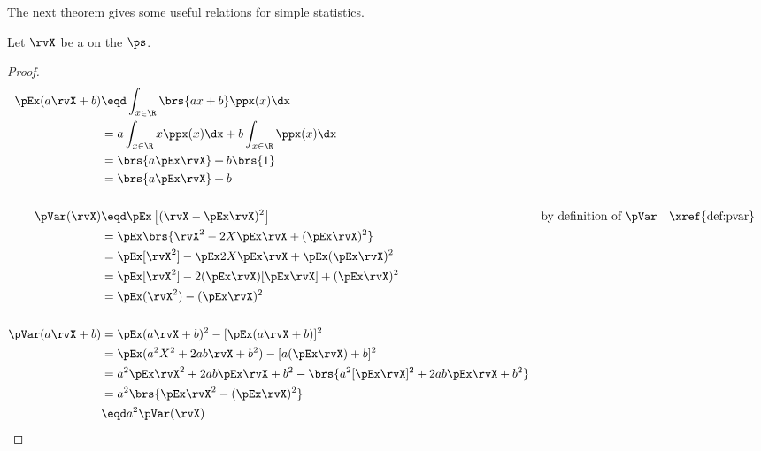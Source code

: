 The next theorem gives some useful relations for simple statistics.
\begin{theorem}
\label{thm:pE}
Let $\rvX$ be a  on the  $\ps$.
\end{theorem}
\begin{proof}
\begin{align*}
  \pEx(a\rvX+b)
    &\eqd \int_{x\in\R}\brs{ax+b} \ppx(x)  \dx
  \\&=    a \int_{x\in\R}x \ppx(x)  \dx + b\int_{x\in\R}\ppx(x)  \dx
  \\&= \brs{a\pEx\rvX} + b\brs{1}
  \\&= \brs{a\pEx\rvX} + b
\\
\\
  \pVar(\rvX)
    &\eqd \pEx\left[(\rvX-\pEx\rvX)^2\right]
    &&    \text{by definition of $\pVar$}
    &&    \text{\xref{def:pvar}}
  \\&=    \pEx\brs{\rvX^2-2X\pEx\rvX + (\pEx\rvX)^2 }
  \\&=    \pEx[\rvX^2]  - \pEx 2X\pEx\rvX  + \pEx (\pEx\rvX)^2
  \\&=    \pEx[\rvX^2] - 2(\pEx\rvX)[\pEx\rvX] + (\pEx\rvX)^2
  \\&=    \pEx(\rvX^2) - (\pEx\rvX)^2
\\
\\
  \pVar(a\rvX+b)
    &=    \pEx(a\rvX+b)^2  - [\pEx(a\rvX+b)]^2
  \\&=    \pEx(a^2X^2+2ab\rvX+b^2)  - [a(\pEx\rvX)+b]^2
  \\&=    a^2 \pEx\rvX^2  +2ab\pEx\rvX + b^2 - \brs{a^2[\pEx\rvX]^2 + 2ab\pEx\rvX + b^2}
  \\&=    a^2\brs{ \pEx\rvX^2  - (\pEx\rvX)^2 }
  \\&\eqd a^2 \pVar(\rvX)
\end{align*}
\end{proof}

